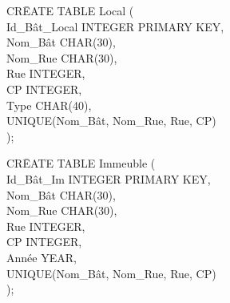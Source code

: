 \documentclass[a4paper,10.5pt]{report}
\begin{document}
		\begin{tabbing}
			CR\=EATE TABLE Local (\\
			\> Id\_Bât\_Local INTEGER PRIMARY KEY,\\
			\> Nom\_Bât CHAR(30),\\
			\> Nom\_Rue CHAR(30),\\
			\> Rue INTEGER,\\
			\> CP INTEGER,\\
			\> Type CHAR(40),\\
			\> UNIQUE(Nom\_Bât, Nom\_Rue, Rue, CP)\\);
		\end{tabbing}
		\begin{tabbing}
			CR\=EATE TABLE Immeuble (\\
			\> Id\_Bât\_Im INTEGER PRIMARY KEY,\\
			\> Nom\_Bât CHAR(30),\\
			\> Nom\_Rue CHAR(30),\\
			\> Rue INTEGER,\\
			\> CP INTEGER,\\
			\> Année YEAR,\\
			\> UNIQUE(Nom\_Bât, Nom\_Rue, Rue, CP)\\);
		\end{tabbing}
\end{document}
